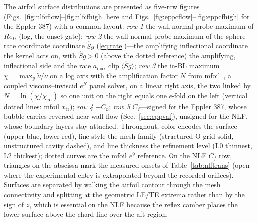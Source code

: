 \documentclass[journal]{new-aiaa}
\begin{document}
The airfoil surface distributions are presented as five-row figures
(Figs.~\ref{fig:nlfcflow}--\ref{fig:nlfcfhigh} here and
Figs.~\ref{fig:eppcflow}--\ref{fig:eppcfhigh} for the Eppler 387) with a
common layout: \emph{row 1} the wall-normal-probe maximum of $Re_\Omega$
(log, the onset gate); \emph{row 2} the wall-normal-probe maximum of the sphere
rate coordinate coordinate $\hat S g$ (\eqref{eq:rate})---the amplifying inflectional
coordinate the kernel acts on, with $\hat S g\!>\!0$ (above the dotted reference) the
amplifying, inflectional side and the rate
$a_{\max}\operatorname{clip}\langle \hat S g\rangle$; \emph{row 3} the in-BL maximum
$\chi\!=\!\max_y\tilde\nu/\nu$ on a log axis with the amplification factor $N$ from
mfoil~\cite{fidkowski_mfoil_2022}, a coupled viscous--inviscid $e^N$ panel solver,
on a linear right axis, the two linked by $N\!=\!\ln(\chi/\chi_\infty)$ so
one unit on the right equals one $e$-fold on the left (vertical dotted lines:
mfoil $x_\mathrm{tr}$); \emph{row 4} $-C_p$; \emph{row 5} $C_f$---signed for
the Eppler 387, whose bubble carries reversed near-wall flow
(Sec.~\ref{sec:eppval}), unsigned for the NLF, whose boundary layers stay
attached.
Throughout, color encodes the surface (upper blue, lower red), line style the
mesh family (structured O-grid solid, unstructured cavity dashed), and line
thickness the refinement level (L0 thinnest, L2 thickest); dotted curves are
the mfoil $e^9$ reference. On the NLF $C_f$ row, triangles on the abscissa
mark the measured onsets of Table~\ref{tab:nlftrans} (open where the
experimental entry is extrapolated beyond the recorded orifices). Surfaces are separated by walking the airfoil
contour through the mesh connectivity and splitting at the geometric LE/TE
extrema rather than by the sign of $z$, which is essential on the NLF because
the reflex camber places the lower surface above the chord line over the aft
region.
\end{document}
